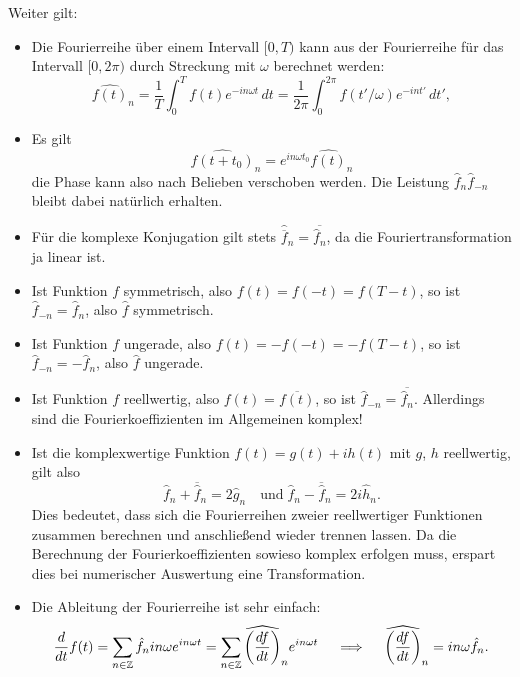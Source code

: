 Weiter gilt:
\begin{itemize}
\item Die Fourierreihe über einem Intervall $[0,T)$ kann aus der
  Fourierreihe für das Intervall $[0,2\pi)$ durch Streckung mit
  $\omega$ berechnet werden:
  \begin{equation}
    \widehat{f(t)}_n = \frac{1}{T}\int_0^T f(t)e^{-i n\omega t}\, dt
    = \frac{1}{2\pi}\int_0^{2\pi} f(t'/\omega)e^{-i n t'}\, dt',
  \end{equation}
\item Es gilt
  \begin{equation}
    \widehat{f(t + t_0)}_{n} = e^{i n \omega t_0} \widehat{f(t)}_{n}
  \end{equation}
  die Phase kann also nach Belieben verschoben werden. Die Leistung
  $\hat{f}_{n}\hat{f}_{-n}$ bleibt dabei natürlich erhalten.
\item Für die komplexe Konjugation gilt stets
  $\widehat{\overline{f}}_n = \overline{\hat{f}_n}$, da die
  Fouriertransformation ja linear ist.
\item Ist Funktion $f$ symmetrisch, also $f(t) = f(-t) = f(T-t)$, so ist
  $\hat{f}_{-n} = \hat{f}_n$, also $\hat{f}$ symmetrisch.
\item Ist Funktion $f$ ungerade, also $f(t) = -f(-t) = -f(T-t)$, so ist
  $\hat{f}_{-n} = -\hat{f}_n$, also $\hat{f}$ ungerade.
\item Ist Funktion $f$ reellwertig, also $f(t) = \overline{f(t)}$, so
  ist $\hat{f}_{-n} = \overline{\hat{f}_n}$. Allerdings sind die
  Fourierkoeffizienten im Allgemeinen komplex!
\item 
  Ist die komplexwertige Funktion $f(t)=g(t) + ih(t)$ mit $g$, $h$
  reellwertig, gilt also
  \begin{equation}
    \hat{f}_{n}  + \overline{\hat{f}}_{n} = 2\widehat{g}_{n}
    \quad\text{und}\;
    \hat{f}_{n}  - \overline{\hat{f}}_{n} = 2i\widehat{h}_{n}.
  \end{equation}
  Dies bedeutet, dass sich die Fourierreihen zweier reellwertiger
  Funktionen zusammen berechnen und anschließend wieder trennen
  lassen. Da die Berechnung der Fourierkoeffizienten sowieso komplex
  erfolgen muss, erspart dies bei numerischer Auswertung eine
  Transformation.
\item Die Ableitung der Fourierreihe ist sehr einfach:
  \begin{equation}
    \frac{d}{dt}  f(t) = \sum_{n\in\mathbb{Z}} \hat{f}_n i n\omega e^{i n\omega
      t} = \sum_{n\in\mathbb{Z}} \widehat{\left(\frac{df}{dt}\right)}_n e^{i n\omega
      t}\quad\implies\quad \widehat{\left(\frac{df}{dt}\right)}_n= i n\omega\hat{f}_n.
  \end{equation}
\end{itemize}

